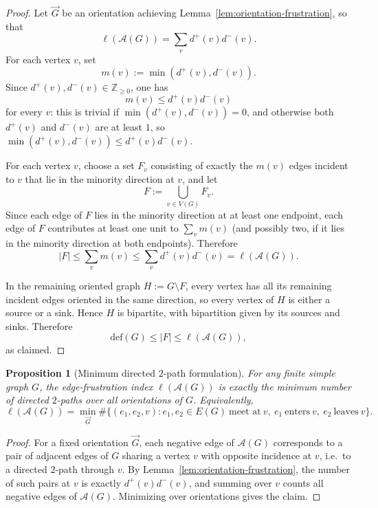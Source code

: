 \documentclass[11pt]{article}
\newtheorem{proposition}{Proposition}
\theoremstyle{plain}
\begin{document}
\begin{proof}
Let $\vec G$ be an orientation achieving Lemma~\ref{lem:orientation-frustration},
so that
\[
\ell(\mathcal A(G))=\sum_v d^+(v)d^-(v).
\]
For each vertex $v$, set
\[
m(v):=\min(d^+(v),d^-(v)).
\]
Since $d^+(v),d^-(v)\in\mathbb Z_{\ge 0}$, one has
\[
m(v)\le d^+(v)d^-(v)
\]
for every $v$: this is trivial if $\min(d^+(v),d^-(v))=0$, and otherwise both
$d^+(v)$ and $d^-(v)$ are at least $1$, so
$\min(d^+(v),d^-(v))\le d^+(v)d^-(v)$.

For each vertex $v$, choose a set $F_v$ consisting of exactly the $m(v)$ edges
incident to $v$ that lie in the minority direction at $v$, and let
\[
F:=\bigcup_{v\in V(G)}F_v.
\]
Since each edge of $F$ lies in the minority direction at at least one endpoint,
each edge of $F$ contributes at least one unit to \(\sum_v m(v)\) (and possibly
two, if it lies in the minority direction at both endpoints). Therefore
\[
|F|\le \sum_v m(v)\le \sum_v d^+(v)d^-(v)=\ell(\mathcal A(G)).
\]

In the remaining oriented graph $H:=G\setminus F$, every vertex has all its
remaining incident edges oriented in the same direction, so every vertex of $H$
is either a source or a sink.
Hence $H$ is bipartite, with bipartition given by its sources and sinks.
Therefore
\[
\mathrm{def}(G)\le |F|\le \ell(\mathcal A(G)),
\]
as claimed.
\end{proof}

\begin{proposition}[Minimum directed $2$-path formulation]
\label{prop:min-transit}
For any finite simple graph $G$, the edge-frustration index $\ell(\mathcal A(G))$
is exactly the minimum number of directed $2$-paths over all orientations of $G$.
Equivalently,
\[
\ell(\mathcal A(G))
=
\min_{\vec G}
\#\bigl\{(e_1,e_2,v): e_1,e_2\in E(G)\ \text{meet at}\ v,\ e_1\ \text{enters}\ v,\ e_2\ \text{leaves}\ v\bigr\}.
\]
\end{proposition}

\begin{proof}
For a fixed orientation $\vec G$, each negative edge of $\mathcal A(G)$ corresponds
to a pair of adjacent edges of $G$ sharing a vertex $v$ with opposite incidence at
$v$, i.e.\ to a directed $2$-path through $v$.
By Lemma~\ref{lem:orientation-frustration}, the number of such pairs at $v$ is
exactly $d^+(v)d^-(v)$, and summing over $v$ counts all negative edges of
$\mathcal A(G)$.
Minimizing over orientations gives the claim.
\end{proof}
\end{document}
